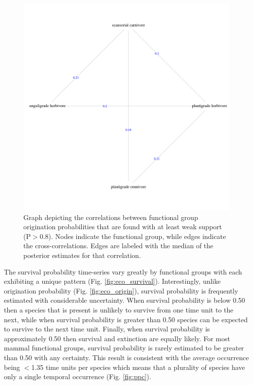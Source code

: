 \documentclass[12pt,letterpaper]{article}
\begin{document}
\begin{figure}[ht]
  \centering
  \includegraphics[width=\textwidth,height=\textheight,keepaspectratio=true]{figure/origin_sig_corr}
  \caption{Graph depicting the correlations between functional group origination probabilities that are found with at least weak support (P\(>\)0.8). Nodes indicate the functional group, while edges indicate the cross-correlations. Edges are labeled with the median of the posterior estimates for that correlation.} 
  \label{fig:origin_sig_corr}
\end{figure}





The survival probability time-series vary greatly by functional groups with each exhibiting a unique pattern (Fig. \ref{fig:eco_survival}). Interestingly, unlike origination probability (Fig. \ref{fig:eco_origin}), survival probability is frequently estimated with considerable uncertainty. When survival probability is below 0.50 then a species that is present is unlikely to survive from one time unit to the next, while when survival probability is greater than 0.50 species can be expected to survive to the next time unit. Finally, when survival probability is approximately 0.50 then survival and extinction are equally likely. For most mammal functional groups, survival probability is rarely estimated to be greater than 0.50 with any certainty. This result is consistent with the average occurrence being \(<\)1.35 time units per species which means that a plurality of species have only a single temporal occurrence (Fig. \ref{fig:ppc}).
\end{document}
